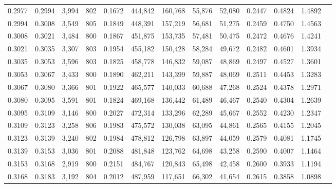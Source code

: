 \begin{tabular}{rrrrrrrrrrrrr}
0.2977 & 0.2994 &  3,994 & 802 &                                     0.1672 & 444,842 & 160,768 &  55,876 &  52,080 & 0.2447 & 0.4824 & 1.4892 \\
0.2994 & 0.3008 &  3,549 & 805 &                                     0.1849 & 448,391 & 157,219 &  56,681 &  51,275 & 0.2459 & 0.4750 & 1.4563 \\
0.3008 & 0.3021 &  3,484 & 800 &                                     0.1867 & 451,875 & 153,735 &  57,481 &  50,475 & 0.2472 & 0.4676 & 1.4241 \\
0.3021 & 0.3035 &  3,307 & 803 &                                     0.1954 & 455,182 & 150,428 &  58,284 &  49,672 & 0.2482 & 0.4601 & 1.3934 \\
0.3035 & 0.3053 &  3,596 & 803 &                                     0.1825 & 458,778 & 146,832 &  59,087 &  48,869 & 0.2497 & 0.4527 & 1.3601 \\
0.3053 & 0.3067 &  3,433 & 800 &                                     0.1890 & 462,211 & 143,399 &  59,887 &  48,069 & 0.2511 & 0.4453 & 1.3283 \\
0.3067 & 0.3080 &  3,366 & 801 &                                     0.1922 & 465,577 & 140,033 &  60,688 &  47,268 & 0.2524 & 0.4378 & 1.2971 \\
0.3080 & 0.3095 &  3,591 & 801 &                                     0.1824 & 469,168 & 136,442 &  61,489 &  46,467 & 0.2540 & 0.4304 & 1.2639 \\
0.3095 & 0.3109 &  3,146 & 800 &                                     0.2027 & 472,314 & 133,296 &  62,289 &  45,667 & 0.2552 & 0.4230 & 1.2347 \\
0.3109 & 0.3123 &  3,258 & 806 &                                     0.1983 & 475,572 & 130,038 &  63,095 &  44,861 & 0.2565 & 0.4155 & 1.2045 \\
0.3123 & 0.3139 &  3,240 & 802 &                                     0.1984 & 478,812 & 126,798 &  63,897 &  44,059 & 0.2579 & 0.4081 & 1.1745 \\
0.3139 & 0.3153 &  3,036 & 801 &                                     0.2088 & 481,848 & 123,762 &  64,698 &  43,258 & 0.2590 & 0.4007 & 1.1464 \\
0.3153 & 0.3168 &  2,919 & 800 &                                     0.2151 & 484,767 & 120,843 &  65,498 &  42,458 & 0.2600 & 0.3933 & 1.1194 \\
0.3168 & 0.3183 &  3,192 & 804 &                                     0.2012 & 487,959 & 117,651 &  66,302 &  41,654 & 0.2615 & 0.3858 & 1.0898 \\

\end{tabular}
